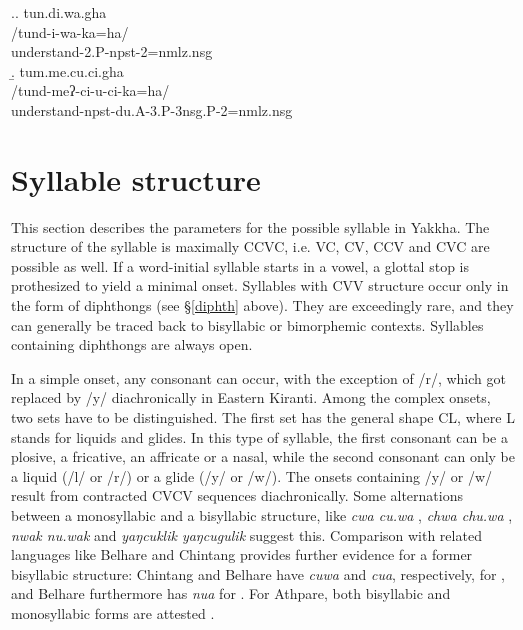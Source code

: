 \ex.\a. \glll tun.di.wa.gha\\
/tund-i-wa-ka=ha/\\
understand{\sc [3A]-2.P-npst-2=nmlz.nsg}\\
\b. \glll tum.me.cu.ci.gha\\
/tund-meʔ-ci-u-ci-ka=ha/\\
understand{\sc -npst-du.A-3.P-3nsg.P-2=nmlz.nsg}\\



\section{Syllable structure}\label{syllable}

This section describes the parameters for the possible syllable in Yakkha. The structure of the syllable is maximally CCVC, i.e. VC, CV,  CCV and CVC are possible as well. If a word-initial syllable starts in a vowel, a glottal stop is prothesized to yield a minimal onset. Syllables with CVV structure occur only in the form of diphthongs (see §\ref{diphth} above). They are exceedingly rare, and they can generally be traced back to bisyllabic or bimorphemic contexts. Syllables containing diphthongs are always open. 

In a simple onset, any consonant can occur, with the exception of  /r/, which got replaced by /y/ diachronically in Eastern Kiranti. Among the complex onsets, two sets have to be distinguished. The first set has the general shape CL, where L stands for  liquids and glides. In this type of syllable, the first consonant can be a plosive, a fricative, an affricate or a nasal, while the second consonant can only be a liquid (/l/ or /r/) or a glide (/y/ or /w/). The onsets containing /y/ or /w/ result from contracted CVCV sequences diachronically. Some alternations between a monosyllabic and a bisyllabic structure, like \emph{cwa \ti cu.wa} , \emph{chwa \ti chu.wa} , \emph{nwak \ti nu.wak}  and \emph{yaŋcuklik \ti yaŋcugulik}  suggest this. Comparison with related languages like Belhare and Chintang provides further evidence for a former bisyllabic structure: Chintang and Belhare have \emph{cuwa} and \emph{cua}, respectively, for , and Belhare furthermore has \emph{nua} for  \citep{Bickel1997Dictionary, Raietal2011_Chintangdict}. For Athpare, both bisyllabic and monosyllabic forms are attested \citep{Ebert1997A-grammar}.

